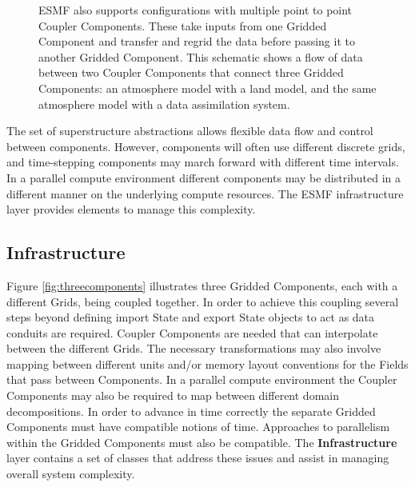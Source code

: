 \begin{figure}
\caption{ESMF also supports configurations with multiple point to point Coupler 
Components. These take inputs from one Gridded Component and transfer and regrid 
the data before passing it to another Gridded Component. This schematic shows a 
flow of data between two Coupler Components that connect three Gridded Components:  
an atmosphere model with a land model, and the same atmosphere model with a data 
assimilation system.}
\label{fig:point2point}
\end{figure}

The set of superstructure abstractions allows flexible data flow and control 
between components. However, components will often use different discrete grids, 
and time-stepping components may march forward with different time intervals. 
In a parallel compute environment different components may be distributed in a 
different manner on the underlying compute resources. The ESMF infrastructure 
layer provides elements to manage this complexity.

\subsection{Infrastructure}
\label{sec:infrastructure}
Figure \ref{fig:threecomponents} illustrates three Gridded Components, 
each with a different Grids, being coupled together. In 
order to achieve this coupling several steps beyond defining import State and 
export State objects to act as data conduits are required. Coupler Components 
are needed that can interpolate between the different Grids.  The necessary 
transformations may also involve mapping between different units and/or memory 
layout conventions for the Fields that pass between Components. In a parallel 
compute environment the Coupler Components may also be required to map between 
different domain decompositions. In order to advance in time correctly the 
separate Gridded Components must have compatible notions of time. Approaches to 
parallelism within the Gridded Components must also be compatible. The 
{\bf Infrastructure} layer contains a set of classes that address these issues 
and assist in managing overall system complexity.


